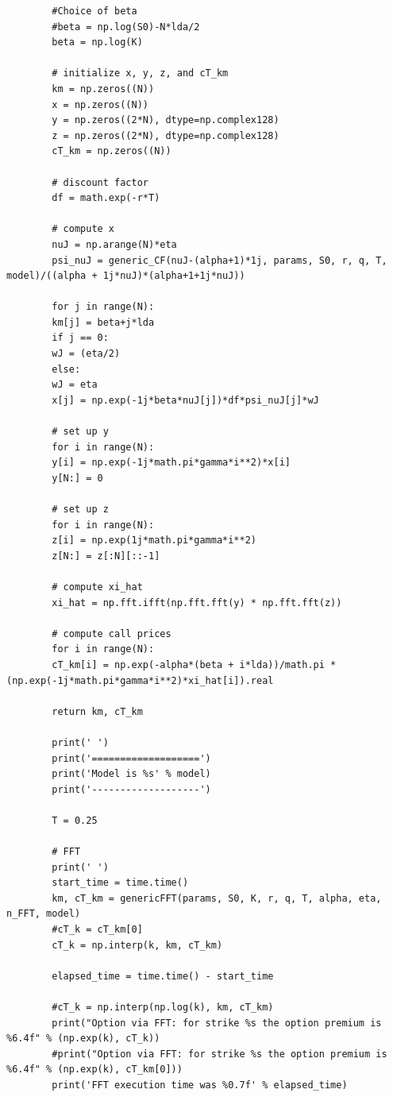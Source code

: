 \documentclass[margin=1in]{article}
\begin{document}
\begin{lstlisting}
       	#Choice of beta
       	#beta = np.log(S0)-N*lda/2
       	beta = np.log(K)
       	
       	# initialize x, y, z, and cT_km
       	km = np.zeros((N))
       	x = np.zeros((N))
       	y = np.zeros((2*N), dtype=np.complex128)
       	z = np.zeros((2*N), dtype=np.complex128)
       	cT_km = np.zeros((N)) 
       	
       	# discount factor
       	df = math.exp(-r*T)
       	
       	# compute x
       	nuJ = np.arange(N)*eta
       	psi_nuJ = generic_CF(nuJ-(alpha+1)*1j, params, S0, r, q, T, model)/((alpha + 1j*nuJ)*(alpha+1+1j*nuJ))
       	
       	for j in range(N):  
       	km[j] = beta+j*lda
       	if j == 0:
       	wJ = (eta/2)
       	else:
       	wJ = eta
       	x[j] = np.exp(-1j*beta*nuJ[j])*df*psi_nuJ[j]*wJ
       	
       	# set up y
       	for i in range(N):
       	y[i] = np.exp(-1j*math.pi*gamma*i**2)*x[i]
       	y[N:] = 0
       	
       	# set up z
       	for i in range(N):
       	z[i] = np.exp(1j*math.pi*gamma*i**2)
       	z[N:] = z[:N][::-1]
       	
       	# compute xi_hat
       	xi_hat = np.fft.ifft(np.fft.fft(y) * np.fft.fft(z))
       	
       	# compute call prices
       	for i in range(N):
       	cT_km[i] = np.exp(-alpha*(beta + i*lda))/math.pi * (np.exp(-1j*math.pi*gamma*i**2)*xi_hat[i]).real
       	
       	return km, cT_km
       	
       	print(' ')
       	print('===================')
       	print('Model is %s' % model)
       	print('-------------------')
       	
       	T = 0.25
       	
       	# FFT
       	print(' ')
       	start_time = time.time()
       	km, cT_km = genericFFT(params, S0, K, r, q, T, alpha, eta, n_FFT, model)
       	#cT_k = cT_km[0]
       	cT_k = np.interp(k, km, cT_km)
       	
       	elapsed_time = time.time() - start_time
       	
       	#cT_k = np.interp(np.log(k), km, cT_km)
       	print("Option via FFT: for strike %s the option premium is %6.4f" % (np.exp(k), cT_k))
       	#print("Option via FFT: for strike %s the option premium is %6.4f" % (np.exp(k), cT_km[0]))
       	print('FFT execution time was %0.7f' % elapsed_time)
       	

\end{lstlisting}
\end{document}
